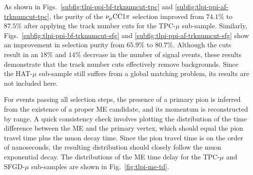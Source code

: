           As shown in Figs.~\ref{subfig:tlpi-ppi-bf-trknumcut-tpc} and \ref{subfig:tlpi-ppi-af-trknumcut-tpc}, the purity of the $\nu_{\mu}\textrm{CC}1\pi$ selection improved from $74.1\%$ to $87.5\%$ after applying the track number cuts for the TPC-$\mu$ sub-sample. 
          Similarly, Figs.~\ref{subfig:tlpi-ppi-bf-trknumcut-sfg} and \ref{subfig:tlpi-ppi-af-trknumcut-sfg} show an improvement in selection purity from $65.9\%$ to $80.7\%$. 
          Although the cuts result in an $18\%$ and $14\%$ decrease in the number of signal events, these results demonstrate that the track number cuts effectively remove backgrounds. 
          Since the HAT-$\mu$ sub-sample still suffers from a global matching problem, its results are not included here.

          For events passing all selection steps, the presence of a primary pion is inferred from the existence of a proper ME candidate, and its momentum is reconstructed by range. 
          A quick consistency check involves plotting the distribution of the time difference between the ME and the primary vertex, which should equal the pion travel time plus the muon decay time. 
          Since the pion travel time is on the order of nanoseconds, the resulting distribution should closely follow the muon exponential decay. 
          The distributions of the ME time delay for the TPC-$\mu$ and SFGD-$\mu$ sub-samples are shown in Fig.~\ref{fig:tlpi-me-td}.
